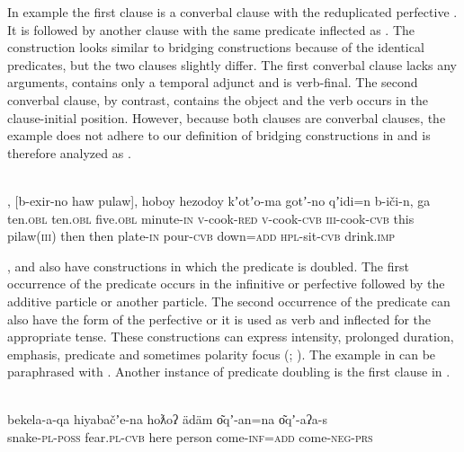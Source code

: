 \documentclass[output=paper]{LSP/langsci}
\begin{document}
In example  the first clause is a converbal clause with the reduplicated perfective . It is followed by another clause with the same predicate inflected as  . The construction looks similar to bridging constructions because of the identical predicates, but the two clauses slightly differ. The first converbal clause lacks any arguments, contains only a temporal adjunct and is verb-final. The second converbal clause, by contrast, contains the object and the verb occurs in the clause-initial position. However, because both clauses are converbal clauses, the example does not adhere to our definition of bridging constructions in  and is therefore analyzed as .

\begin{exe}
	\ex	\label{ex:20ab} 
	\\
			, [b-exir-no  haw  pulaw],  hoboy hezodoy kʼotʼo-ma   gotʼ-no  qʼidi=n    b-iči-n, ga\\
			ten.\textsc{obl}  ten.\textsc{obl} five.\textsc{obl} minute-\textsc{in}  \textsc{v}-cook-\textsc{red} \textsc{v}-cook-\textsc{cvb} \textsc{iii}-cook-\textsc{cvb} this pilaw(\textsc{iii})  then  then    plate-\textsc{in}    pour-\textsc{cvb} down=\textsc{add}  \textsc{hpl}-sit-\textsc{cvb} drink.\textsc{imp} \\
		\glt	{}
\end{exe}

,  and  also have constructions in which the predicate is doubled. The first occurrence of the predicate occurs in the infinitive or perfective  followed by the additive particle or another particle. The second occurrence of the predicate can also have the form of the perfective  or it is used as  verb and inflected for the appropriate tense. These constructions can express intensity, prolonged duration, emphasis, predicate  and sometimes polarity focus (\citealt{Maisak.2010}; \citealt{Forker.2015}). The  example in  can be paraphrased with . Another instance of predicate doubling is the first  clause in .

\ea\label{ex:26ab} 
\\
\gll bekela-a-qa      hiyabačʼe-na  hoƛoʔ ädäm       o͂qʼ-an=na o͂qʼ-aʔa-s \\
snake-\textsc{pl}-\textsc{poss} fear.\textsc{pl}-\textsc{cvb} here    person come-\textsc{inf=add}   come-\textsc{neg-prs}\\
\glt {}
\z
\end{document}
